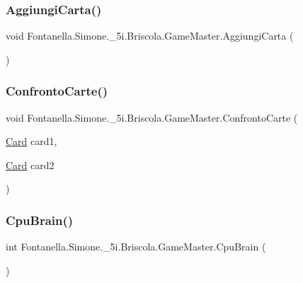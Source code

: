 \subsubsection{\texorpdfstring{Aggiungi\+Carta()}{AggiungiCarta()}}
{\footnotesize\ttfamily void Fontanella.\+Simone.\+\_\+5i.\+Briscola.\+Game\+Master.\+Aggiungi\+Carta (\begin{DoxyParamCaption}{ }\end{DoxyParamCaption})}

\hypertarget{class_fontanella_1_1_simone_1_1__5i_1_1_briscola_1_1_game_master_af7df7cf04ba55033629ead2c41723821}{}\label{class_fontanella_1_1_simone_1_1__5i_1_1_briscola_1_1_game_master_af7df7cf04ba55033629ead2c41723821} 
\subsubsection{\texorpdfstring{Confronto\+Carte()}{ConfrontoCarte()}}
{\footnotesize\ttfamily void Fontanella.\+Simone.\+\_\+5i.\+Briscola.\+Game\+Master.\+Confronto\+Carte (\begin{DoxyParamCaption}\item[{\hyperlink{class_fontanella_1_1_simone_1_1__5i_1_1_briscola_1_1_card}{Card}}]{card1,  }\item[{\hyperlink{class_fontanella_1_1_simone_1_1__5i_1_1_briscola_1_1_card}{Card}}]{card2 }\end{DoxyParamCaption})}

\hypertarget{class_fontanella_1_1_simone_1_1__5i_1_1_briscola_1_1_game_master_affb9a5a6fa94208a622c976f9d3cf6bd}{}\label{class_fontanella_1_1_simone_1_1__5i_1_1_briscola_1_1_game_master_affb9a5a6fa94208a622c976f9d3cf6bd} 
\subsubsection{\texorpdfstring{Cpu\+Brain()}{CpuBrain()}}
{\footnotesize\ttfamily int Fontanella.\+Simone.\+\_\+5i.\+Briscola.\+Game\+Master.\+Cpu\+Brain (\begin{DoxyParamCaption}{ }\end{DoxyParamCaption})}

